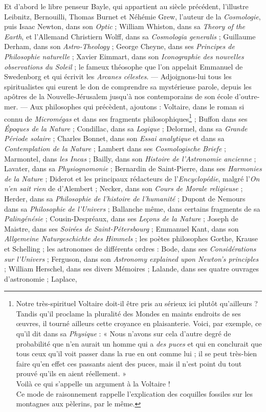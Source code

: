 \documentclass[a4paper, 11pt, oneside]{article}
\begin{document}
Et d'abord le libre penseur Bayle, qui appartient au siècle précédent, l'illustre Leibnitz, Bernouilli, Thomas Burnet et Néhémie Grew, l'auteur de la \emph{Cosmologie}, puis Isaac Newton, dans son \emph{Optic} ; William Whiston, dans sa \emph{Theory of the Earth}, et l'Allemand Christiern Wolff, dans sa \emph{Cosmologia generalis} ; Guillaume Derham, dans son \emph{Astro-Theology} ; George Cheyne, dans ses \emph{Principes de Philosophie naturelle} ; Xavier Eimmart, dans son \emph{Iconographie des nouvelles observations du Soleil} ; le fameux théosophe que l'on appelait Emmanuel de Swedenborg et qui écrivit les \emph{Arcanes célestes}. --- Adjoignons-lui tous les spiritualistes qui eurent le don de comprendre sa mystérieuse parole, depuis les apôtres de la Nouvelle-Jérusalem jusqu'à nos contemporains de son école d'outre-mer. --- Aux philosophes qui précèdent, ajoutons : Voltaire, dans le roman si connu de \emph{Micromégas} et dans ses fragments philosophiques\footnote{Notre très-spirituel Voltaire doit-il être pris au sérieux ici plutôt qu'ailleurs ? Tandis qu'il proclame la pluralité des Mondes en maints endroits de ses œuvres, il tourné ailleurs cette croyance en plaisanterie. Voici, par exemple, ce qu'il dit dans sa \emph{Physique} : « Nous n'avons sur cela d'autre degré de probabilité que n'en aurait un homme qui a \emph{des puces} et qui en conclurait que tous ceux qu'il voit passer dans la rue en ont comme lui ; il se peut très-bien faire qu'en effet ces passants aient des puces, mais il n'est point du tout prouvé qu'ils en aient réellement. »\\\hspace*{5mm}Voilà ce qui s'appelle un argument à la Voltaire !\\\hspace*{5mm}Ce mode de raisonnement rappelle l'explication des coquilles fossiles sur les montagnes aux pèlerins, par le même.} ; Buffon dans ses \emph{Époques de la Nature} ; Condillac, dans sa \emph{Logique} ; Delormel, dans sa \emph{Grande Période solaire} ; Charles Bonnet, dans son \emph{Essai analytique} et dans sa \emph{Contemplation de la Nature} ; Lambert dans ses \emph{Cosmologische Briefe} ; Marmontel, dans \emph{les Incas} ; Bailly, dans son \emph{Histoire de l'Astronomie ancienne} ; Lavater, dans sa \emph{Physiognomonie} ; Bernardin de Saint-Pierre, dans ses \emph{Harmonies de la Nature} ; Diderot et les principaux rédacteurs de l'\emph{Encyclopédie}, malgré l'\emph{On n'en sait rien} de d'Alembert ; Necker, dans son \emph{Cours de Morale religieuse} ; Herder, dans sa \emph{Philosophie de l'histoire de l'humanité} ; Dupont de Nemours dans sa \emph{Philosophie de l'Univers} ; Ballanche même, dans certains fragments de sa \emph{Palingénésie} ; Cousin-Despréaux, dans ses \emph{Leçons de la Nature} ; Joseph de Maistre, dans ses \emph{Soirées de Saint-Pétersbourg} ; Emmanuel Kant, dans son \emph{Allgemeine Naturgeschichte des Himmels} ; les poètes philosophes Gœthe, Krause et Schelling ; les astronomes de différents ordres : Bode, dans ses \emph{Considérations sur l'Univers} ; Ferguson, dans son \emph{Astronomy explained upon Newton's principles} ; William Herschel, dans ses divers Mémoires ; Lalande, dans ses quatre ouvrages d'astronomie ; Laplace, 
\end{document}
